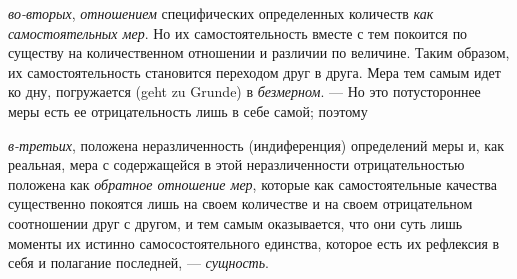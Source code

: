 {\em во-вторых}, {\em отношением}
специфических определенных количеств {\em как
самостоятельных мер}. Но их самостоятельность вместе с тем покоится по
существу на количественном отношении и различии по величине. Таким образом,
их самостоятельность становится переходом друг в друга. Мера тем самым идет
ко дну, погружается (geht zu Grunde) в {\em безмерном}.
— Но это потустороннее меры есть ее отрицательность лишь в себе самой;
поэтому

{\em в-третьих}, положена неразличенность (индиференция)
определений меры и, как реальная, мера с содержащейся в этой
неразличенности отрицательностью положена как
{\em обратное отношение мер}, которые как
самостоятельные качества существенно покоятся лишь на своем количестве и на
своем отрицательном соотношении друг с другом, и тем самым оказывается, что
они суть лишь моменты их истинно самосостоятельного единства, которое есть
их рефлексия в себя и полагание последней, —
{\em сущность}.


